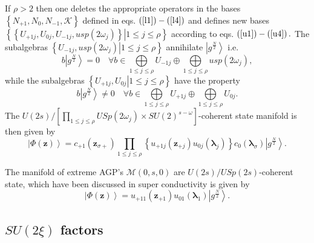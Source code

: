 \documentclass[aps,preprint]{revtex4}%
\begin{document}
If $\rho>2$ then one deletes the appropriate operators in the bases $\left\{
N_{+1},N_{0},N_{-1},\mathcal{K}\right\}  $ defined in eqs. $\left(
\ref{l1}\right)  -\left(  \ref{l4}\right)  $ and defines new bases $\left\{
\left.  \left\{  U_{+1j},U_{0j},U_{-1j},usp\left(  2\omega_{j}\right)
\right\}  \right\vert 1\leq j\leq\rho\right\}  $ according to eqs. $\left(
\ref{u1}\right)  -\left(  \ref{u4}\right)  .$ The subalgebras $\left\{
\left.  U_{-1j},usp\left(  2\omega_{j}\right)  \right\vert 1\leq j\leq
\rho\right\}  $ annihilate $\left\vert g^{\frac{N}{2}}\right\rangle $ i.e.
\begin{equation}
b\left\vert g^{\frac{N}{2}}\right\rangle =0\quad\forall b\in\bigoplus
\limits_{1\leq j\leq\rho}U_{-1j}\oplus\bigoplus\limits_{1\leq j\leq\rho
}usp\left(  2\omega_{j}\right)  ,
\end{equation}
while the subalgebras $\left\{  \left.  U_{+1j},U_{0j}\right\vert 1\leq
j\leq\rho\right\}  $ have the property
\begin{equation}
b\left\vert g^{\frac{N}{2}}\right\rangle \neq0\quad\forall b\in\bigoplus
\limits_{1\leq j\leq\rho}U_{+1j}\oplus\bigoplus\limits_{1\leq j\leq\rho}%
U_{0j}.
\end{equation}
The $U\left(  2s\right)  /\left[
{\textstyle\prod_{1\leq j\leq\rho}}
USp\left(  2\omega_{j}\right)  \times SU\left(  2\right)  ^{s-\omega}\right]
$-coherent state manifold is then given by
\begin{equation}
\left\vert \Phi\left(  \mathbf{z}\right)  \right\rangle =c_{+1}\left(
\mathbf{z}_{\sigma+}\right)
{\textstyle\prod_{1\leq j\leq\rho}}
\left\{  u_{+1j}\left(  \mathbf{z}_{+j}\right)  u_{0j}\left(  \mathbf{\lambda
}_{j}\right)  \right\}  c_{0}\left(  \mathbf{\lambda}_{\sigma}\right)
\left\vert g^{\frac{N}{2}}\right\rangle .
\end{equation}


The manifold of extreme AGP's $\mathcal{M}\left(  0,s,0\right)  $ are
$U\left(  2s\right)  /USp\left(  2s\right)  $-coherent state, which have been
discussed in super conductivity \cite{Yukalov00} is given by
\begin{equation}
\left\vert \Phi\left(  \mathbf{z}\right)  \right\rangle =u_{+11}\left(
\mathbf{z}_{+1}\right)  u_{01}\left(  \mathbf{\lambda}_{1}\right)  \left\vert
g^{\frac{N}{2}}\right\rangle .
\end{equation}


\subsection{$SU\left(  2\xi\right)  $ factors}
\end{document}
